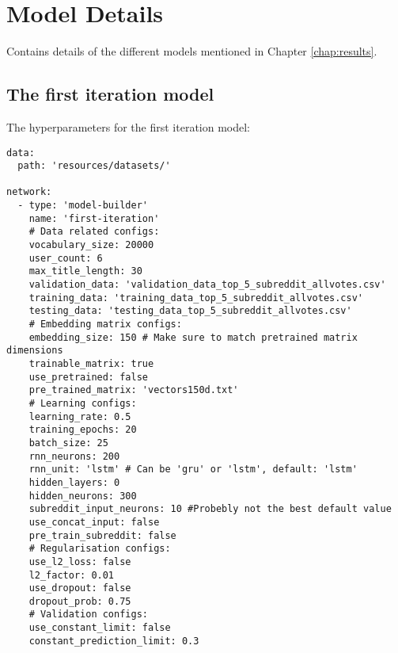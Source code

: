\chapter{Model Details}
Contains details of the different models mentioned in Chapter \ref{chap:results}.

\section{The first iteration model}\label{sec:app2_first_iter}
The hyperparameters for the first iteration model:
\begin{lstlisting}
data:
  path: 'resources/datasets/'

network:
  - type: 'model-builder'
    name: 'first-iteration'
    # Data related configs:
    vocabulary_size: 20000
    user_count: 6
    max_title_length: 30
    validation_data: 'validation_data_top_5_subreddit_allvotes.csv'
    training_data: 'training_data_top_5_subreddit_allvotes.csv'
    testing_data: 'testing_data_top_5_subreddit_allvotes.csv'
    # Embedding matrix configs:
    embedding_size: 150 # Make sure to match pretrained matrix dimensions
    trainable_matrix: true
    use_pretrained: false
    pre_trained_matrix: 'vectors150d.txt'
    # Learning configs:
    learning_rate: 0.5
    training_epochs: 20
    batch_size: 25
    rnn_neurons: 200
    rnn_unit: 'lstm' # Can be 'gru' or 'lstm', default: 'lstm'
    hidden_layers: 0
    hidden_neurons: 300
    subreddit_input_neurons: 10 #Probebly not the best default value
    use_concat_input: false
    pre_train_subreddit: false
    # Regularisation configs:
    use_l2_loss: false
    l2_factor: 0.01
    use_dropout: false
    dropout_prob: 0.75
    # Validation configs:
    use_constant_limit: false
    constant_prediction_limit: 0.3
\end{lstlisting}
